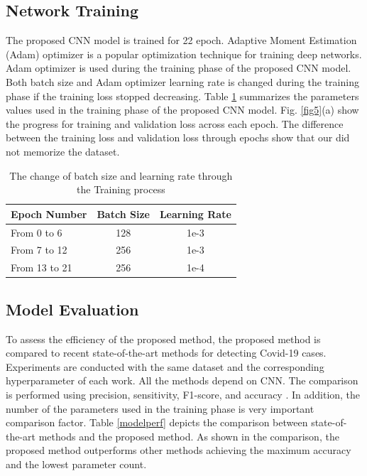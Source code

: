\subsection{Network Training}
The proposed CNN model  is trained for 22 epoch. Adaptive Moment Estimation (Adam) optimizer \cite{kingma2014adam} is a popular optimization  technique for training deep networks. Adam optimizer is used  during the training  phase of the proposed CNN model. Both batch size and Adam optimizer learning rate is changed during the training phase if the training loss stopped decreasing. Table \ref{tabTrparam} summarizes the parameters values used in the training phase of the proposed CNN model.  Fig. \ref{fig5}(a) show the progress for training and validation loss across each epoch. The difference between the training loss and validation loss through epochs show that our did not memorize the dataset.
\begin{table}[htbp]
\caption{The change of batch size and learning rate through the Training process}
\begin{center}

\begin{tabular}{|l|c|c|}
\hline
\textbf{Epoch Number} & \textbf{Batch Size} & \textbf{Learning Rate} \\
\hline
\hline
From 0 to 6 & 128 & 1e-3\\
\hline
From 7 to 12 & 256 & 1e-3\\
\hline
From 13 to 21 & 256 & 1e-4\\
\hline
 
\end{tabular}
\label{tabTrparam}
\end{center}
\end{table}



\subsection{Model Evaluation}

To assess the efficiency of the proposed method,  the proposed method is compared to recent state-of-the-art methods for detecting Covid-19 cases. Experiments are conducted with the same dataset and the corresponding hyperparameter of each work. All the methods depend on CNN. The comparison is performed using precision, sensitivity, F1-score, and accuracy \cite{hossin2015review}. In addition, the number of the parameters used in the training phase is very important comparison factor. Table \ref{modelperf} depicts the comparison between state-of-the-art methods and the proposed method. As shown in the comparison, the proposed method  outperforms other methods achieving the maximum accuracy and the lowest  parameter count. 



